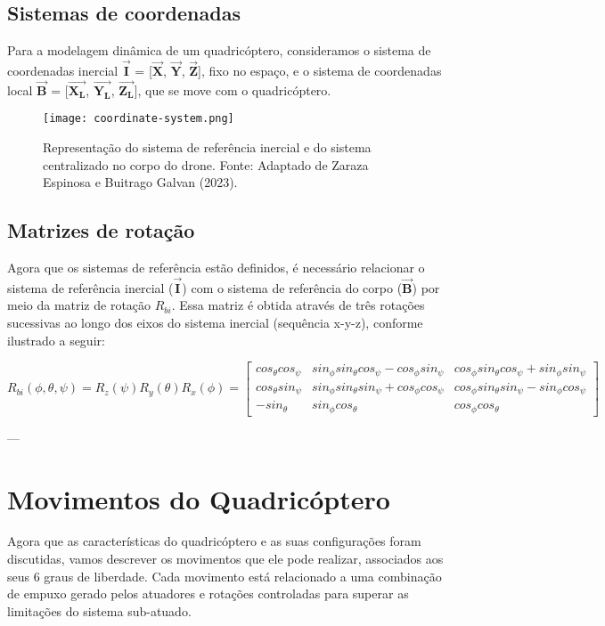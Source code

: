 \subsection{Sistemas de coordenadas}
Para a modelagem dinâmica de um quadricóptero, consideramos o sistema de coordenadas inercial $\boldsymbol{\vec{I}}$ = [$\boldsymbol{\vec{X}}$, $\boldsymbol{\vec{Y}}$, $\boldsymbol{\vec{Z}}$], fixo no espaço, e o sistema de coordenadas local $\boldsymbol{\vec{B}}$ = [$\boldsymbol{\vec{X_L}}$, $\boldsymbol{\vec{Y_L}}$, $\boldsymbol{\vec{Z_L}}$], que se move com o quadricóptero.

\begin{figure}[H]
	\centering
	\texttt{[image: coordinate-system.png]}
	\caption{Representação do sistema de referência inercial e do sistema centralizado no corpo do drone. Fonte: Adaptado de Zaraza Espinosa e Buitrago Galvan (2023).}
	\centering
	\label{fig:coordinate-system}
\end{figure}

\subsection{Matrizes de rotação}
Agora que os sistemas de referência estão definidos, é necessário relacionar o sistema de referência inercial ($\boldsymbol{\vec{I}}$) com o sistema de referência do corpo ($\boldsymbol{\vec{B}}$) por meio da matriz de rotação $R_{bi}$. Essa matriz é obtida através de três rotações sucessivas ao longo dos eixos do sistema inercial (sequência x-y-z), conforme ilustrado a seguir:

\[
	R_{bi}(\phi,\theta,\psi) = R_z(\psi) R_y(\theta) R_x(\phi) =
	\begin{bmatrix}
		cos_\theta cos_\psi & sin_\phi sin_\theta cos_\psi - cos_\phi sin_\psi & cos_\phi sin_\theta cos_\psi + sin_\phi sin_\psi \\
		cos_\theta sin_\psi & sin_\phi sin_\theta sin_\psi + cos_\phi cos_\psi & cos_\phi sin_\theta sin_\psi - sin_\phi cos_\psi \\
		-sin_\theta         & sin_\phi cos_\theta                              & cos_\phi cos_\theta
	\end{bmatrix}
\]

---

\section{Movimentos do Quadricóptero}
Agora que as características do quadricóptero e as suas configurações foram discutidas, vamos descrever os movimentos que ele pode realizar, associados aos seus 6 graus de liberdade. Cada movimento está relacionado a uma combinação de empuxo gerado pelos atuadores e rotações controladas para superar as limitações do sistema sub-atuado.

